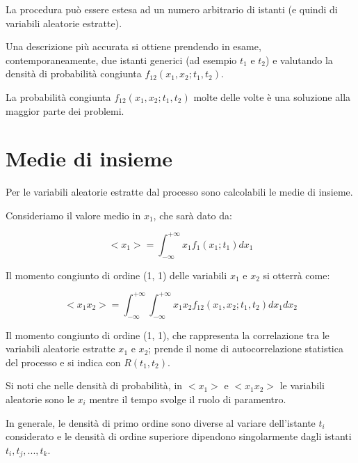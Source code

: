 La procedura può essere estesa ad un numero arbitrario di istanti (e quindi di variabili aleatorie estratte). \newline 

Una descrizione più accurata si ottiene prendendo in esame, contemporaneamente, due istanti generici (ad esempio $t_1$ e $t_2$) e valutando la densità di probabilità congiunta $f_{12} (x_1, x_2; t_1, t_2)$. \newline 

La probabilità congiunta $f_{12} (x_1, x_2; t_1, t_2)$ molte delle volte è una soluzione alla maggior parte dei problemi. \newline 


\newpage 

\section{Medie di insieme} 

Per le variabili aleatorie estratte dal processo sono calcolabili le medie di insieme. \newline 

Consideriamo il valore medio in $x_1$, che sarà dato da: 

{
    \Large 
    \begin{equation}
        <x_1> 
        = 
        \int_{- \infty}^{+\infty}
        x_1 f_1 (x_1; t_1) dx_1
    \end{equation}
}

Il momento congiunto di ordine (1, 1) delle variabili $x_1$ e $x_2$ si otterrà come: 

{
    \Large 
    \begin{equation}
        <x_1 x_2> 
        = 
        \int_{- \infty}^{+\infty}
        \int_{- \infty}^{+\infty}
        x_1 x_2 f_{12} (x_1, x_2; t_1, t_2) 
        dx_1
        dx_2
    \end{equation}
}

Il momento congiunto di ordine (1, 1), che rappresenta la correlazione tra le variabili aleatorie estratte $x_1$ e $x_2$; 
prende il nome di autocorrelazione statistica del processo e si indica con $R(t_1, t_2)$. \newline 

Si noti che nelle densità di probabilità, in $<x_1>$ e $<x_1 x_2>$ le variabili aleatorie sono le $x_i$ mentre il tempo svolge il ruolo di paramentro. \newline 

In generale, le densità di primo ordine sono diverse al variare dell'istante $t_i$ considerato e le densità di ordine superiore 
dipendono singolarmente dagli istanti $t_i, t_j, ..., t_k$. \newline 

